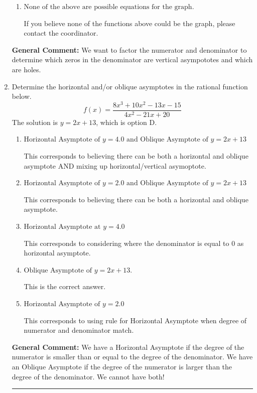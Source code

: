 \documentclass{extbook}[14pt]
\newcommand{\litem}[1]{\item #1

\rule{\textwidth}{0.4pt}}
\begin{document}
\begin{enumerate}
{\begin{enumerate}[label=\Alph*.]
This is the correct answer!
\item \( \text{None of the above are possible equations for the graph.} \)

If you believe none of the functions above could be the graph, please contact the coordinator.
\end{enumerate}

\textbf{General Comment:} We want to factor the numerator and denominator to determine which zeros in the denominator are vertical asympototes and which are holes.
}
\litem{
Determine the horizontal and/or oblique asymptotes in the rational function below.
\[ f(x) = \frac{8x^{3} +10 x^{2} -13 x -15}{4x^{2} -21 x + 20} \]The solution is \( y = 2x + 13 \), which is option D.\begin{enumerate}[label=\Alph*.]
\item \( \text{Horizontal Asymptote of } y = 4.0 \text{ and Oblique Asymptote of } y = 2x + 13 \)

This corresponds to believing there can be both a horizontal and oblique asymptote AND mixing up horizontal/vertical asymoptote.
\item \( \text{Horizontal Asymptote of } y = 2.0 \text{ and Oblique Asymptote of } y = 2x + 13 \)

This corresponds to believing there can be both a horizontal and oblique asymptote.
\item \( \text{Horizontal Asymptote at } y = 4.0 \)

This corresponds to considering where the denominator is equal to 0 as horizontal asymptote.
\item \( \text{Oblique Asymptote of } y = 2x + 13. \)

This is the correct answer.
\item \( \text{Horizontal Asymptote of } y = 2.0  \)

This corresponds to using rule for Horizontal Asymptote when degree of numerator and denominator match.
\end{enumerate}

\textbf{General Comment:} We have a Horizontal Asymptote if the degree of the numerator is smaller than or equal to the degree of the denominator. We have an Oblique Asymptote if the degree of the numerator is larger than the degree of the denominator. We cannot have both!
}
\end{enumerate}
\end{document}
